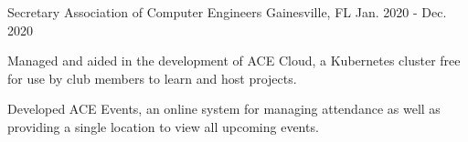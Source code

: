 \begin{cventries}
  \cventry
    {Secretary}
    {Association of Computer Engineers}
    {Gainesville, FL}
    {Jan. 2020 - Dec. 2020}
    {
      \begin{cvitems}
        \item {Managed and aided in the development of ACE Cloud, a Kubernetes cluster free for use by club members to learn and host projects.}
        \item {Developed ACE Events, an online system for managing attendance as well as providing a single location to view all upcoming events.}
      \end{cvitems}
    }
\end{cventries}
